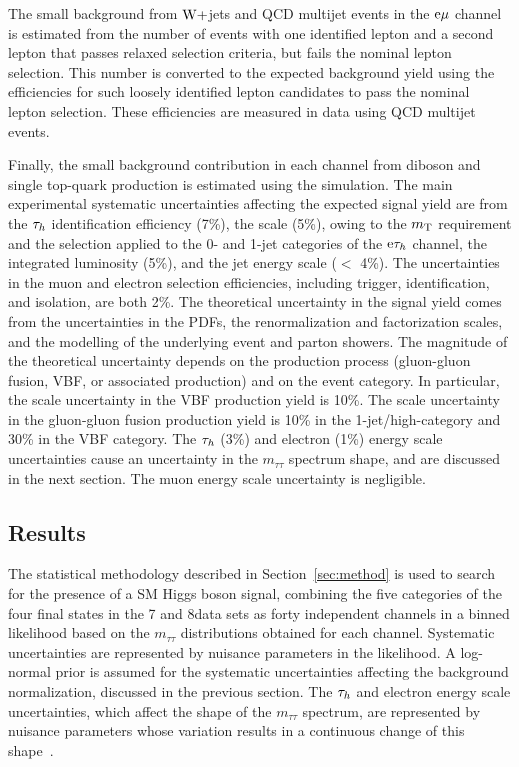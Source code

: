 \documentclass[11pt,twoside,a4paper,cmspaper,final,collab]{cms-tdr}
\begin{document}
The small background from $\mathrm{W}+$jets and QCD multijet events in the $\mathrm{e}{\mu}$
channel is estimated from the number of events with one identified lepton and a second lepton
that passes relaxed selection criteria, but fails the nominal lepton selection.
This number is converted to the expected background yield using the efficiencies
for such loosely identified lepton candidates to pass the nominal lepton selection. These efficiencies
are measured in data using QCD multijet events.

Finally, the small background contribution in each channel from diboson and single top-quark production is estimated using the simulation.
The main experimental systematic uncertainties affecting the expected signal yield are from the $\tau_h$ identification efficiency (7\%),
the \MET scale (5\%), owing to the $m_\mathrm{T}$ requirement and the \MET selection applied to the 0- and 1-jet categories of the $\mathrm{e}\tau_h$ channel,
the integrated luminosity (5\%), and the jet energy scale ($<$ 4\%).
The uncertainties in the muon and electron selection efficiencies, including trigger, identification, and isolation,
are both 2\%.
The theoretical uncertainty in the signal yield comes from the uncertainties in the PDFs,
the renormalization and factorization scales, and the modelling of the underlying event and parton showers.
The magnitude of the theoretical uncertainty depends on the production process (gluon-gluon fusion, VBF, or associated production)
and on the event category.
In particular, the scale uncertainty in the VBF production yield is 10\%.
The scale uncertainty in the gluon-gluon fusion production yield is 10\% in the 1-jet/high-\pt category
and 30\% in the VBF category.
The $\tau_h$ (3\%) and electron (1\%) energy scale uncertainties cause an uncertainty in the $m_{\tau\tau}$ spectrum shape, and are discussed in the next section.
The muon energy scale uncertainty is negligible.

\subsection{Results}

The statistical methodology described in Section~\ref{sec:method} is used to search for the presence of a SM Higgs boson signal,
combining the five categories of the four final states in the 7 and 8\TeV data sets as forty independent channels in a
binned likelihood based on the $m_{\tau\tau}$ distributions obtained for each channel.
Systematic uncertainties are represented by nuisance parameters in the likelihood.
A log-normal prior is assumed for the systematic uncertainties affecting the background normalization, discussed in the previous section.
The $\tau_h$ and electron energy scale uncertainties, which affect the shape of the $m_{\tau\tau}$
spectrum, are represented by nuisance parameters whose variation results in a
continuous change of this shape~\cite{Conway-PhyStat}.
\end{document}
